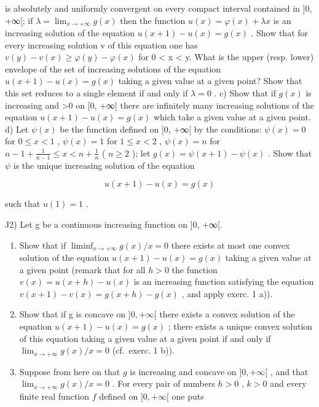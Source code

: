 is absolutely and uniformly convergent on every compact interval contained in {]}0, +∞{[}; if \(\lambda = \lim_{x \to +\infty} g(x)\) then the function \(u(x) = \varphi(x) + \lambda x\) is an increasing solution of the equation \(u(x+1) - u(x) = g(x)\) . Show that for every increasing solution v of this equation one has \(v(y) - v(x) \geqslant \varphi(y) - \varphi(x)\) for 0 \textless{} x \textless{} y. What is the upper (resp. lower) envelope of the set of increasing solutions of the equation \(u(x+1) - u(x) = g(x)\) taking a given value at a given point? Show that this set reduces to a single element if and only if \(\lambda = 0\) . c) Show that if \(g(x)\) is increasing and \textgreater0 on {[}0, +∞{]} there are infinitely many increasing solutions of the equation \(u(x+1) - u(x) = g(x)\) which take a given value at a given point. d) Let \(\psi(x)\) be the function defined on {]}0, +∞{[} by the conditions: \(\psi(x)=0\) for \(0\leqslant x<1\) , \(\psi(x)=1\) for \(1\leqslant x<2\) , \(\psi(x)=n\) for \(n-1+\frac{1}{n-1}\leqslant x<n+\frac{1}{n}\) ( \(n\geqslant2\) ); let \(g(x)=\psi(x+1)-\psi(x)\) . Show that \(\psi\) is the unique increasing solution of the equation

\[
u (x + 1) - u (x) = g (x)
\]

such that \(u(1)=1\) .

J2) Let g be a continuous increasing function on {]}0, +∞{[}.

\begin{enumerate}
\def\labelenumi{\alph{enumi})}
\item
  Show that if \(\liminf_{x\to +\infty}g(x) / x = 0\) there exists at most one convex solution of the equation \(u(x + 1) - u(x) = g(x)\) taking a given value at a given point (remark that for all \(h > 0\) the function \(v(x) = u(x + h) - u(x)\) is an increasing function satisfying the equation \(v(x + 1) - v(x) = g(x + h) - g(x)\) , and apply exerc. 1 a)).
\item
  Show that if g is concave on \(]0, +\infty[\) there exists a convex solution of the equation \(u(x+1) - u(x) = g(x)\) ; there exists a unique convex solution of this equation taking a given value at a given point if and only if \(\lim_{x \to +\infty} g(x)/x = 0\) (cf.~exerc. 1 b)).
\item
  Suppose from here on that \(g\) is increasing and concave on \(]0, +\infty[\) , and that \(\lim_{x \to +\infty} g(x) / x = 0\) . For every pair of numbers \(h > 0\) , \(k > 0\) and every finite real function \(f\) defined on \(]0, +\infty[\) one puts
\end{enumerate}

